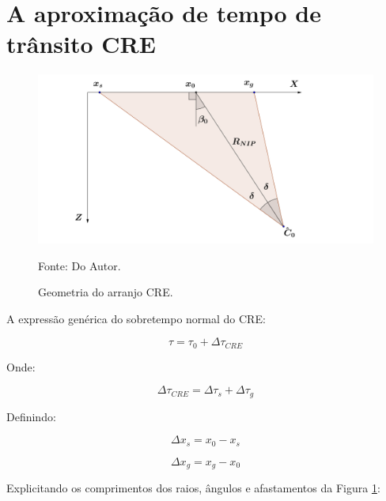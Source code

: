 \documentclass[a4paper, 12pt]{article}
\begin{document}
\section{A aproximação de tempo de trânsito CRE}

\begin{figure}[H]
\caption{Geometria do arranjo CRE.}
\begin{center}
\includegraphics[scale=0.5]{images/creGeom.png}
\vspace{-0.3cm}
\end{center}
\begin{center}
 Fonte: Do Autor.
\end{center}
\label{fig:1.1}
\end{figure}

A expressão genérica do sobretempo normal do CRE:

\begin{equation}
\label{eq:1.1}
\tau = \tau_0 + \Delta \tau_{CRE}
\end{equation}

Onde:

\begin{equation}
\label{eq:1.2}
\Delta \tau_{CRE} = \Delta \tau_s + \Delta \tau_g
\end{equation}

Definindo:

\begin{equation}
\label{eq:1.3}
\Delta x_s = x_0 - x_s
\end{equation}

\begin{equation}
\label{eq:1.4}
\Delta x_g = x_g - x_0
\end{equation}

Explicitando os comprimentos dos raios, ângulos e afastamentos da Figura \ref{fig:1.1}:
\end{document}

